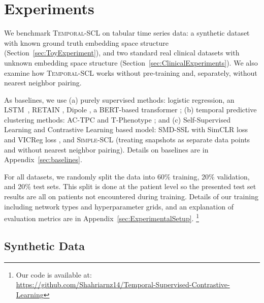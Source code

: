\documentclass[pmlr,twocolumn,10pt]{jmlr} %
\begin{document}
\vspace{-1.15em}
\section{Experiments}
\vspace{-.35em}
We benchmark \textsc{Temporal-SCL} on tabular time series data:
a synthetic dataset with known ground truth embedding space structure (Section~\ref{sec:ToyExperiment}), and two standard real clinical datasets with unknown embedding space structure (Section~\ref{sec:ClinicalExperiments}). %
We also examine how \textsc{Temporal-SCL} works without pre-training and, separately, without nearest neighbor pairing.

As baselines, we use (a) purely supervised methods: logistic regression, an LSTM~\citep{hochreiter1997long}, \mbox{RETAIN} \citep{choi2016retain}, Dipole \citep{ma2017dipole}, a BERT-based transformer \citep{devlin2018bert}; (b) temporal predictive clustering methods: AC-TPC \citep{lee2020temporal} and T-Phenotype \citep{qin2023t}; and (c) Self-Supervised Learning and Contrastive Learning based model: SMD-SSL \citep{raghu2023sequential} with SimCLR loss \citep{chen2020simple} and VICReg loss \citep{bardes2021vicreg}, and \mbox{\textsc{Simple-SCL}} (treating snapshots as separate data points and without nearest neighbor pairing). Details on baselines are in Appendix~\ref{sec:baselines}.

For all datasets, we randomly split the data into 60\% training, 20\% validation, and 20\% test sets. 
This split is done at the patient level so the presented test set results are all on patients not encountered during training. Details of our training including network types and hyperparameter grids, and an explanation of evaluation metrics are in Appendix~\ref{sec:ExperimentalSetup}.
\footnote{Our code is available at: \\ \url{https://github.com/Shahriarnz14/Temporal-Supervised-Contrastive-Learning}}

\vspace{-1em}   
\subsection{Synthetic Data}
\vspace{-.25em}
\end{document}
